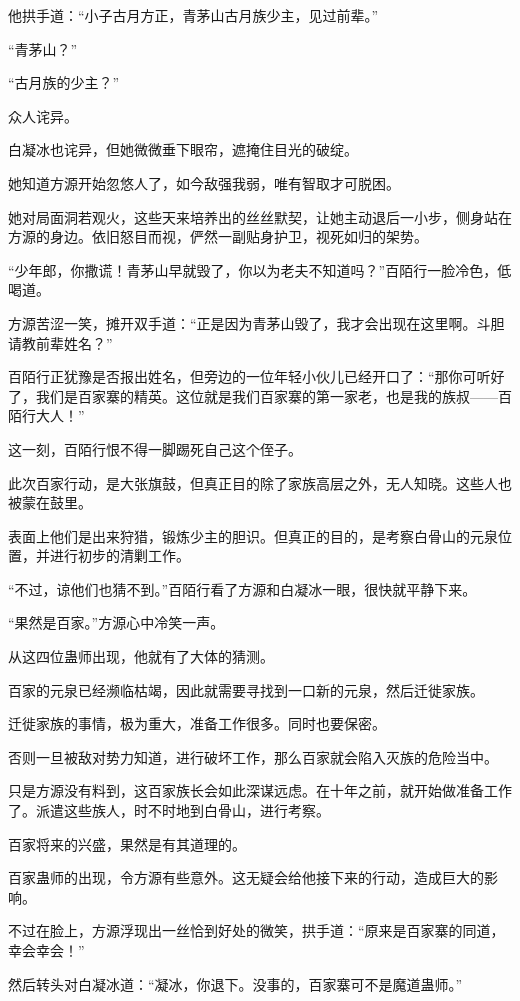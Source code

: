 \begin{this_body}
他拱手道：“小子古月方正，青茅山古月族少主，见过前辈。”

“青茅山？”

“古月族的少主？”

众人诧异。

白凝冰也诧异，但她微微垂下眼帘，遮掩住目光的破绽。

她知道方源开始忽悠人了，如今敌强我弱，唯有智取才可脱困。

她对局面洞若观火，这些天来培养出的丝丝默契，让她主动退后一小步，侧身站在方源的身边。依旧怒目而视，俨然一副贴身护卫，视死如归的架势。

“少年郎，你撒谎！青茅山早就毁了，你以为老夫不知道吗？”百陌行一脸冷色，低喝道。

方源苦涩一笑，摊开双手道：“正是因为青茅山毁了，我才会出现在这里啊。斗胆请教前辈姓名？”

百陌行正犹豫是否报出姓名，但旁边的一位年轻小伙儿已经开口了：“那你可听好了，我们是百家寨的精英。这位就是我们百家寨的第一家老，也是我的族叔——百陌行大人！”

这一刻，百陌行恨不得一脚踢死自己这个侄子。

此次百家行动，是大张旗鼓，但真正目的除了家族高层之外，无人知晓。这些人也被蒙在鼓里。

表面上他们是出来狩猎，锻炼少主的胆识。但真正的目的，是考察白骨山的元泉位置，并进行初步的清剿工作。

“不过，谅他们也猜不到。”百陌行看了方源和白凝冰一眼，很快就平静下来。

“果然是百家。”方源心中冷笑一声。

从这四位蛊师出现，他就有了大体的猜测。

百家的元泉已经濒临枯竭，因此就需要寻找到一口新的元泉，然后迁徙家族。

迁徙家族的事情，极为重大，准备工作很多。同时也要保密。

否则一旦被敌对势力知道，进行破坏工作，那么百家就会陷入灭族的危险当中。

只是方源没有料到，这百家族长会如此深谋远虑。在十年之前，就开始做准备工作了。派遣这些族人，时不时地到白骨山，进行考察。

百家将来的兴盛，果然是有其道理的。

百家蛊师的出现，令方源有些意外。这无疑会给他接下来的行动，造成巨大的影响。

不过在脸上，方源浮现出一丝恰到好处的微笑，拱手道：“原来是百家寨的同道，幸会幸会！”

然后转头对白凝冰道：“凝冰，你退下。没事的，百家寨可不是魔道蛊师。”


\end{this_body}
